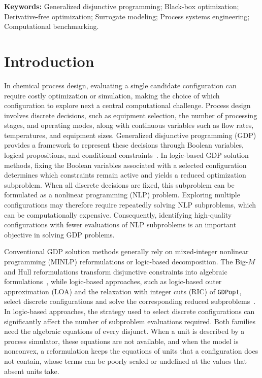 \documentclass{article}
\title{\papertitle}
\author[1]{\paperfirstauthor\orcidB}
\author[2]{\papersecondauthor\orcidC}
\author[1,*]{\papercorrespondingauthor\orcidA}
\affil[1]{Davidson School of Chemical Engineering, Purdue University, West Lafayette, IN 47907, USA}
\affil[2]{Elmore Family School of Electrical and Computer Engineering, Purdue University, West Lafayette, IN 47907, USA}
\date{*Email: \papercorrespondingemail}
\begin{document}
\maketitle

\begin{abstract}

\end{abstract}

\noindent\textbf{Keywords:} Generalized disjunctive programming; Black-box optimization; Derivative-free optimization; Surrogate modeling; Process systems engineering; Computational benchmarking.

\section{Introduction}
In chemical process design, evaluating a single candidate configuration can require costly optimization or simulation, making the choice of which configuration to explore next a central computational challenge.
Process design involves discrete decisions, such as equipment selection, the number of processing stages, and operating modes, along with continuous variables such as flow rates, temperatures, and equipment sizes.
Generalized disjunctive programming (GDP) provides a framework to represent these decisions through Boolean variables, logical propositions, and conditional constraints~\citep{raman1994modelling}.
In logic-based GDP solution methods, fixing the Boolean variables associated with a selected configuration determines which constraints remain active and yields a reduced optimization subproblem.
When all discrete decisions are fixed, this subproblem can be formulated as a nonlinear programming (NLP) problem.
Exploring multiple configurations may therefore require repeatedly solving NLP subproblems, which can be computationally expensive.
Consequently, identifying high-quality configurations with fewer evaluations of NLP subproblems is an important objective in solving GDP problems.

Conventional GDP solution methods generally rely on mixed-integer nonlinear programming (MINLP) reformulations or logic-based decomposition.
The Big-\(M\) and Hull reformulations transform disjunctive constraints into algebraic formulations~\citep{raman1994modelling,grossmann2003hull}, while logic-based approaches, such as logic-based outer approximation (LOA) and the relaxation with integer cuts (RIC) of \texttt{GDPopt}, select discrete configurations and solve the corresponding reduced subproblems~\citep{turkay1996logic,bergamini2005logic,pyomoGDPopt}.
In logic-based approaches, the strategy used to select discrete configurations can significantly affect the number of subproblem evaluations required.
Both families need the algebraic equations of every disjunct.
When a unit is described by a process simulator, these equations are not available, and when the model is nonconvex, a reformulation keeps the equations of units that a configuration does not contain, whose terms can be poorly scaled or undefined at the values that absent units take.
\end{document}
